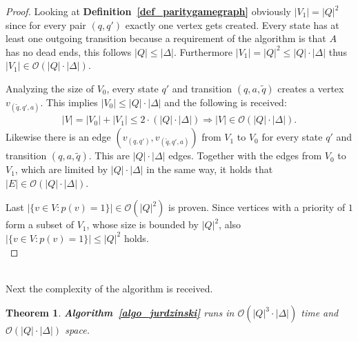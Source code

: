 \documentclass[12pt,oneside,bibliography=totoc,abstracton]{scrartcl}
\newcommand{\algoref}[1]{\textbf{Algorithm~\ref{#1}}}
\newcommand{\defref}[1]{\textbf{Definition~\ref{#1}}}
\newtheorem{mytheorem}{Theorem}
\begin{document}
\begin{proof}
	Looking at \defref{def_paritygamegraph} obviously $|V_1| = |Q|^2$ since for every pair $(q, q')$
	exactly one vertex gets created. Every state has at least one outgoing transition because
	a requirement of the algorithm is that $A$ has no dead ends, this follows $|Q| \le |\Delta|$.
	Furthermore $|V_1| = |Q|^2 \le |Q| \cdot |\Delta|$ thus $|V_1| \in \mathcal{O}(|Q| \cdot |\Delta|)$.

	Analyzing the size of $V_0$, every state $q'$ and transition $(q, a, \tilde{q})$
	creates a vertex $v_{(\tilde{q}, q', a)}$. This implies $|V_0| \le |Q| \cdot |\Delta|$ and the following is received:
	\begin{align*}
		|V| = |V_0| + |V_1| \le 2 \cdot (|Q| \cdot |\Delta|) \Rightarrow |V| \in \mathcal{O}(|Q| \cdot |\Delta|).
	\end{align*}
	Likewise there is an edge $(v_{(q, q')}, v_{(\tilde{q}, q', a)})$ from $V_1$ to $V_0$ for every
	state $q'$ and transition $(q, a, \tilde{q})$. This are $|Q| \cdot |\Delta|$ edges.
	Together with the edges from $V_0$ to $V_1$, which are limited by $|Q| \cdot |\Delta|$ in the same way,
	it holds that $|E| \in \mathcal{O}(|Q| \cdot |\Delta|)$.
	
	Last $|\{v \in V : p(v) = 1\}| \in \mathcal{O}(|Q|^2)$ is proven. Since vertices with a
	priority of $1$ form a subset of $V_1$, whose size is bounded by $|Q|^2$, also
	$|\{v \in V : p(v) = 1\}| \le |Q|^2$ holds.\\
\end{proof}\quad\\
Next the complexity of the algorithm is received.
\begin{mytheorem}\label{theorem_jurdzcomplexity}
	\algoref{algo_jurdzinski} runs in $\mathcal{O}(|Q|^3 \cdot |\Delta|)$ time
	and $\mathcal{O}(|Q| \cdot |\Delta|)$ space.
\end{mytheorem}
\end{document}
